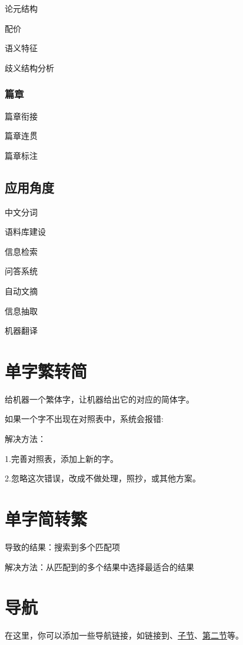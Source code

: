 \documentclass{ctexart}
\begin{document}
论元结构

配价

语义特征

歧义结构分析

\subsubsection{篇章}

篇章衔接

篇章连贯

篇章标注

\subsection{应用角度}

中文分词

语料库建设

信息检索

问答系统

自动文摘

信息抽取

机器翻译

\section{单字繁转简}
给机器一个繁体字，让机器给出它的对应的简体字。

如果一个字不出现在对照表中，系统会报错:

解决方法：

1.完善对照表，添加上新的字。

2.忽略这次错误，改成不做处理，照抄，或其他方案。

\section{单字简转繁}
导致的结果：搜索到多个匹配项

解决方法：从匹配到的多个结果中选择最适合的结果

\clearpage

\section*{导航}
\label{sec:navigation}

在这里，你可以添加一些导航链接，如链接到、\hyperref[subsec:sub]{子节}、\hyperref[sec:second]{第二节}等。
\end{document}
